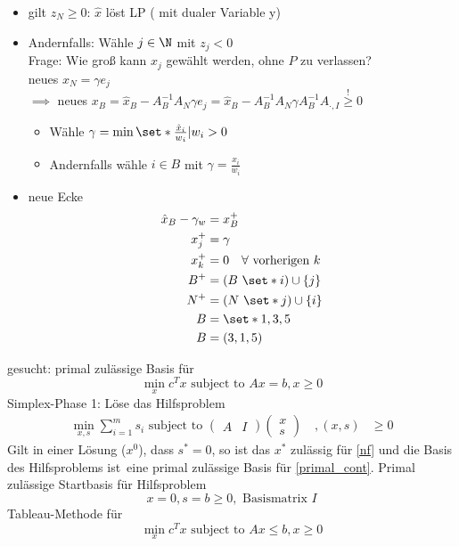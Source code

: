 \begin{itemize}
	\item gilt $z_{N} \geq 0$: $\hat{x}$ löst LP ( mit dualer Variable y)
	\item Andernfalls: Wähle $j\in \N$ mit $z_{j}<0$ \\
		Frage: Wie groß kann $x_{j}$ gewählt werden, ohne $P$ zu verlassen?\\
		neues $x_{N}= \gamma e_{j}$ \\
		$\implies$ neues $x_{B} = \hat{x}_{B}-A_{B}^{-1}A_{N}\gamma e_{j}= \hat{x}_{B}-A_{B}^{-1}A_{N}\gamma A_{B}^{-1}A_{\cdot,I} \overset{!}{\geq} 0$
		\begin{itemize}
			\item Wähle $\gamma = \min \set*{ \frac{\hat{x}_{i}}{w_{i}}|w_{i} > 0 }$
			\item Andernfalls wähle $i \in B$ mit $\gamma = \frac{\hat{x}_{i}}{w_{i}}$
		\end{itemize}
	\item neue Ecke
		\begin{align*}
			\hat{x}_{B}-\gamma_{w}&= x_{B}^+\\
			x_{j}^+& = \gamma\\
			x_{k}^+ &= 0 \quad \forall \text{ vorherigen } k\\
			B^+ &= (B \ \set*{i})\cup \{j\}\\
			N^+ &= (N \ \set*{j})\cup \{i\}\\
			B& = \set*{1,3,5} \\
			B& = (3,1,5)
		\end{align*}
\end{itemize}
gesucht: primal zulässige Basis für
\begin{equation*}
	\min_{x} c^Tx \text{ subject to } Ax = b , x \geq 0
\end{equation*}
Simplex-Phase 1: Löse das Hilfsproblem
\begin{align*}
	\min_{x,s} \sum_{i=1}^{m} s_{i} \text{ subject to }
	\begin{pmatrix}
		A& I
	\end{pmatrix}
	\begin{pmatrix}
		x \\ s
	\end{pmatrix}
	\quad,(x,s)& \geq 0
\end{align*}
Gilt in einer Lösung ($x^0$), dass $s^* =0$, so ist das $x^*$ zulässig für \eqref{nf} und die Basis des Hilfsproblems \glqq ist\grqq\ eine primal zulässige Basis für \eqref{primal_cont}.
Primal zulässige Startbasis für Hilfsproblem
\begin{equation*}
	x = 0, s = b \geq 0, \text{ Basismatrix } I
\end{equation*}
Tableau-Methode für
\begin{equation*}
	\min_{x}c^Tx \text{ subject to } Ax \leq b , x \geq 0
\end{equation*}
